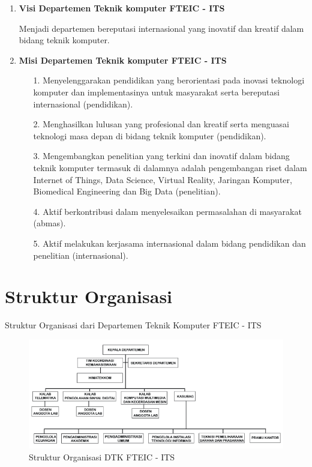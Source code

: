 \begin{enumerate}[nolistsep]

  \item \textbf{Visi Departemen Teknik komputer FTEIC - ITS}

	Menjadi departemen bereputasi internasional yang inovatif dan kreatif dalam bidang teknik komputer.

  \item \textbf{Misi Departemen Teknik komputer FTEIC - ITS}

  \begin{enumerate}[nolistsep]

    \item [1. ] Menyelenggarakan pendidikan yang berorientasi pada inovasi teknologi komputer dan implementasinya untuk masyarakat serta bereputasi internasional (pendidikan).

    \item [2. ] Menghasilkan lulusan yang profesional dan kreatif serta menguasai teknologi masa depan di bidang teknik komputer (pendidikan).

    \item [3. ] Mengembangkan penelitian yang terkini dan inovatif dalam bidang teknik komputer termasuk di dalamnya adalah pengembangan riset dalam Internet of Things, Data Science, Virtual Reality, Jaringan Komputer, Biomedical Engineering dan Big Data (penelitian).

    \item [4. ] Aktif berkontribusi dalam menyelesaikan permasalahan di masyarakat (abmas).

    \item [5. ] Aktif melakukan kerjasama internasional dalam bidang pendidikan dan penelitian (internasional).
  \end{enumerate}

\end{enumerate}

\section{Struktur Organisasi}

Struktur Organisasi dari Departemen Teknik Komputer FTEIC - ITS

\begin{figure} [ht] \centering
  \includegraphics[scale=0.4]{gambar/organisasi.png}
  \caption{Struktur Organisasi DTK FTEIC - ITS}
  \label{fig:Organisasi}
\end{figure}

